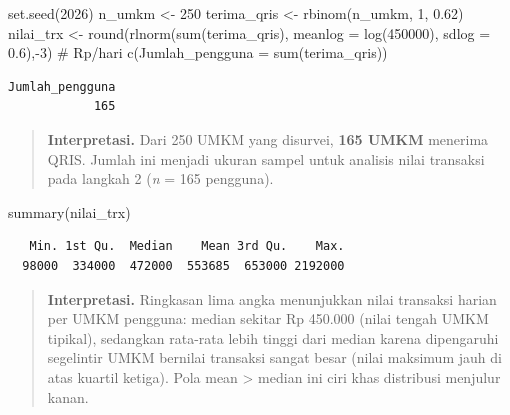 \documentclass[
  indonesian,
  letterpaper,
]{book}
\newenvironment{Shaded}{\begin{snugshade}}{\end{snugshade}}
\newcommand{\AttributeTok}[1]{\textcolor[rgb]{0.40,0.45,0.13}{#1}}
\newcommand{\CommentTok}[1]{\textcolor[rgb]{0.37,0.37,0.37}{#1}}
\newcommand{\DecValTok}[1]{\textcolor[rgb]{0.68,0.00,0.00}{#1}}
\newcommand{\FloatTok}[1]{\textcolor[rgb]{0.68,0.00,0.00}{#1}}
\newcommand{\FunctionTok}[1]{\textcolor[rgb]{0.28,0.35,0.67}{#1}}
\newcommand{\NormalTok}[1]{\textcolor[rgb]{0.00,0.23,0.31}{#1}}
\newcommand{\OtherTok}[1]{\textcolor[rgb]{0.00,0.23,0.31}{#1}}
\newcommand{\SpecialCharTok}[1]{\textcolor[rgb]{0.37,0.37,0.37}{#1}}
\begin{document}
\begin{Shaded}
\begin{Highlighting}[]
\FunctionTok{set.seed}\NormalTok{(}\DecValTok{2026}\NormalTok{)}
\NormalTok{n\_umkm }\OtherTok{\textless{}{-}} \DecValTok{250}
\NormalTok{terima\_qris }\OtherTok{\textless{}{-}} \FunctionTok{rbinom}\NormalTok{(n\_umkm, }\DecValTok{1}\NormalTok{, }\FloatTok{0.62}\NormalTok{)}
\NormalTok{nilai\_trx }\OtherTok{\textless{}{-}} \FunctionTok{round}\NormalTok{(}\FunctionTok{rlnorm}\NormalTok{(}\FunctionTok{sum}\NormalTok{(terima\_qris), }\AttributeTok{meanlog =} \FunctionTok{log}\NormalTok{(}\DecValTok{450000}\NormalTok{), }\AttributeTok{sdlog =} \FloatTok{0.6}\NormalTok{),}\SpecialCharTok{{-}}\DecValTok{3}\NormalTok{) }\CommentTok{\# Rp/hari}
\FunctionTok{c}\NormalTok{(}\AttributeTok{Jumlah\_pengguna =} \FunctionTok{sum}\NormalTok{(terima\_qris))}
\end{Highlighting}
\end{Shaded}

\begin{verbatim}
Jumlah_pengguna 
            165 
\end{verbatim}

\begin{quote}
\textbf{Interpretasi.} Dari 250 UMKM yang disurvei, \textbf{165 UMKM}
menerima QRIS. Jumlah ini menjadi ukuran sampel untuk analisis nilai
transaksi pada langkah 2 (\emph{n} = 165 pengguna).
\end{quote}

\begin{Shaded}
\begin{Highlighting}[]
\FunctionTok{summary}\NormalTok{(nilai\_trx)}
\end{Highlighting}
\end{Shaded}

\begin{verbatim}
   Min. 1st Qu.  Median    Mean 3rd Qu.    Max. 
  98000  334000  472000  553685  653000 2192000 
\end{verbatim}

\begin{quote}
\textbf{Interpretasi.} Ringkasan lima angka menunjukkan nilai transaksi
harian per UMKM pengguna: median sekitar Rp 450.000 (nilai tengah UMKM
tipikal), sedangkan rata-rata lebih tinggi dari median karena
dipengaruhi segelintir UMKM bernilai transaksi sangat besar (nilai
maksimum jauh di atas kuartil ketiga). Pola mean \textgreater{} median
ini ciri khas distribusi menjulur kanan.
\end{quote}
\end{document}
